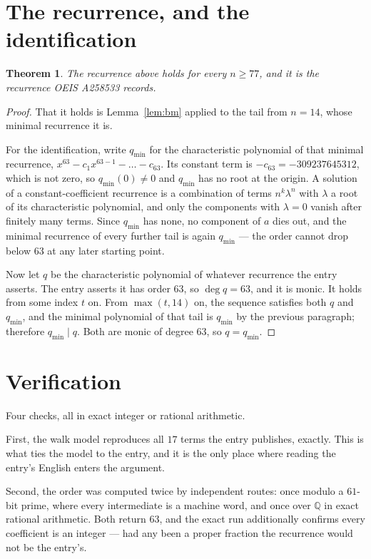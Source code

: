 \documentclass[11pt,a4paper]{article}
\theoremstyle{plain}
\newtheorem{theorem}{Theorem}
\theoremstyle{definition}
\begin{document}
\section{The recurrence, and the identification}

\begin{theorem}
The recurrence above holds for every $n\ge77$, and it is the recurrence OEIS A258533 records.
\end{theorem}

\begin{proof}
That it holds is Lemma~\ref{lem:bm} applied to the tail from $n=14$, whose minimal
recurrence it is.

For the identification, write $q_{\min}$ for the characteristic polynomial of that minimal
recurrence, $x^{63}-c_1x^{63-1}-\dots-c_{63}$. Its constant term is
$-c_{63}=-309237645312$, which is not zero, so $q_{\min}(0)\neq0$ and $q_{\min}$ has no
root at the origin. A solution of a constant-coefficient recurrence is a combination of terms
$n^{k}\lambda^{n}$ with $\lambda$ a root of its characteristic polynomial, and only the
components with $\lambda=0$ vanish after finitely many terms. Since $q_{\min}$ has none, no
component of $a$ dies out, and the minimal recurrence of every further tail is again
$q_{\min}$ --- the order cannot drop below $63$ at any later starting point.

Now let $q$ be the characteristic polynomial of whatever recurrence the entry asserts. The
entry asserts it has order $63$, so $\deg q=63$, and it is monic. It holds from some
index $t$ on. From $\max(t,14)$ on, the sequence satisfies both $q$ and $q_{\min}$, and
the minimal polynomial of that tail is $q_{\min}$ by the previous paragraph; therefore
$q_{\min}\mid q$. Both are monic of degree $63$, so $q=q_{\min}$.
\end{proof}

\section{Verification}

Four checks, all in exact integer or rational arithmetic.

First, the walk model reproduces all $17$ terms the entry publishes, exactly. This is
what ties the model to the entry, and it is the only place where reading the entry's English
enters the argument.

Second, the order was computed twice by independent routes: once modulo a $61$-bit prime, where
every intermediate is a machine word, and once over $\mathbb{Q}$ in exact rational arithmetic.
Both return $63$, and the exact run additionally confirms every coefficient is an integer
--- had any been a proper fraction the recurrence would not be the entry's.
\end{document}
